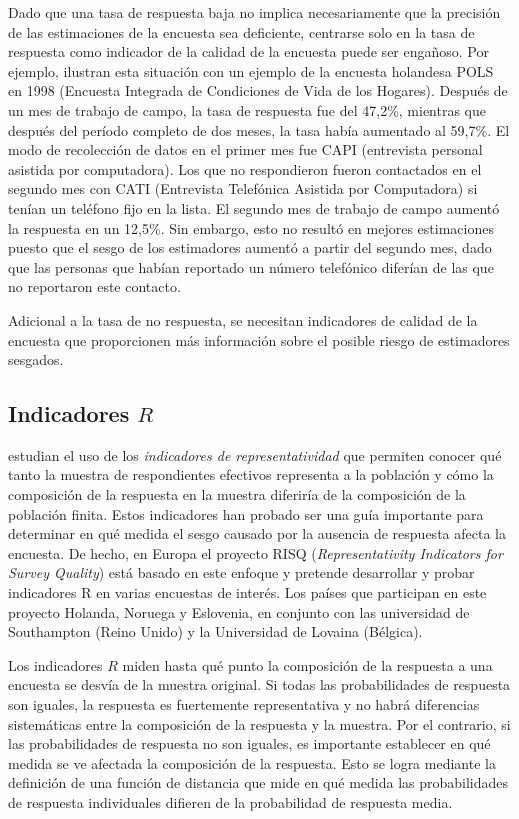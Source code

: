 \documentclass[
  12pt,
  spanish,
]{book}
\begin{document}
Dado que una tasa de respuesta baja no implica necesariamente que la precisión de las estimaciones de la encuesta sea deficiente, centrarse solo en la tasa de respuesta como indicador de la calidad de la encuesta puede ser engañoso. Por ejemplo, \citet{Bethlehem_Cobben_Schouten_2009} ilustran esta situación con un ejemplo de la encuesta holandesa POLS en 1998 (Encuesta Integrada de Condiciones de Vida de los Hogares). Después de un mes de trabajo de campo, la tasa de respuesta fue del 47,2\%, mientras que después del período completo de dos meses, la tasa había aumentado al 59,7\%. El modo de recolección de datos en el primer mes fue CAPI (entrevista
personal asistida por computadora). Los que no respondieron fueron
contactados en el segundo mes con CATI (Entrevista Telefónica Asistida
por Computadora) si tenían un teléfono fijo en la lista. El segundo mes de trabajo de campo aumentó la respuesta en un 12,5\%. Sin embargo, esto no resultó en mejores estimaciones puesto que el sesgo de los estimadores aumentó a partir del segundo mes, dado que las personas que habían reportado un número telefónico diferían de las que no reportaron este contacto.

Adicional a la tasa de no respuesta, se necesitan indicadores
de calidad de la encuesta que proporcionen más información sobre el
posible riesgo de estimadores sesgados.

\hypertarget{indicadores-r}{%
\subsection{\texorpdfstring{Indicadores \(R\)}{Indicadores R}}\label{indicadores-r}}

\citet{Shlomo_Skinner_Schouten_2012} estudian el uso de los \emph{indicadores de representatividad} que permiten conocer qué tanto la muestra de respondientes efectivos representa a la población y cómo la composición
de la respuesta en la muestra diferiría de la composición de la población finita. Estos indicadores han probado ser una guía importante para determinar en qué medida el sesgo causado por la ausencia de respuesta afecta la encuesta. De hecho, en Europa el proyecto RISQ (\emph{Representativity Indicators for Survey Quality}) está basado en este enfoque y pretende desarrollar y probar indicadores R en varias encuestas de interés. Los países que participan en este proyecto Holanda, Noruega y Eslovenia, en conjunto con las universidad de Southampton (Reino Unido) y la Universidad de Lovaina (Bélgica).

Los indicadores \(R\) miden hasta qué punto la composición de
la respuesta a una encuesta se desvía de la muestra original. Si todas las probabilidades de respuesta son iguales, la respuesta
es fuertemente representativa y no habrá diferencias sistemáticas
entre la composición de la respuesta y la muestra. Por el contrario, si las probabilidades de respuesta no son iguales, es importante
establecer en qué medida se ve afectada la composición de la respuesta. Esto se logra mediante la definición de una función de distancia
que mide en qué medida las probabilidades de respuesta individuales
difieren de la probabilidad de respuesta media.
\end{document}
